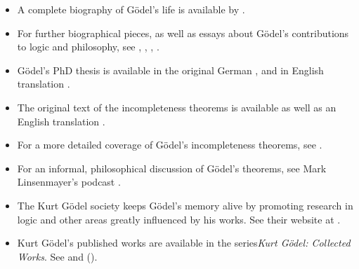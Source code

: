 \documentclass[../../../include/open-logic-section]{subfiles}
\begin{document}

\begin{itemize} 
\item A complete biography of G{\"o}del's life is available
by \citet{Dawson1997}. 

\item For further biographical pieces, as well as
essays about G{\"o}del's contributions to logic and philosophy, see
\citet{Wang1990}, \citet{Baaz2011}, \citet{Takeuti2003}, \citet{Sigmund2007}.

\item G{\"o}del's PhD thesis is available in the original German
\citep{Godel1929}, and in English translation \citep{Godel1986}. 

\item The original text of the incompleteness theorems is available 
\citep{Godel1931} as well as an English translation \citep{Godel1986}. 

\item For a more detailed coverage of G{\"o}del's incompleteness theorems,
 see \citet{Smith2013}. 
 
 \item For an informal, philosophical discussion of G{\"o}del's theorems, 
 see Mark Linsenmayer's podcast \citep{Linsenmayer2014}. 

\item The Kurt G{\"o}del society keeps G{\"o}del's
memory alive by promoting research in logic and other areas greatly
influenced by his works. See their website at \citet{Society2015}.

\item Kurt G{\"o}del's published works are available in the series\emph{Kurt G{\"o}del: 
Collected Works}. See \citet{Godel1986} and (\citeyear{Godel1990}).

\end{itemize}
\end{document}
